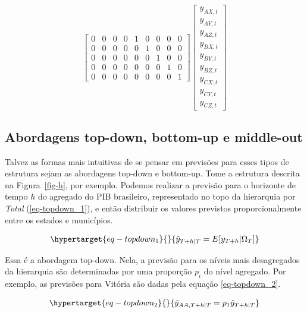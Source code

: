 \documentclass[
  12pt,
  oneside,
  a4paper,
  chapter=TITLE,
  section=TITLE,
  brazil]{abntex2}
\begin{document}
\begin{equation}
{\begin{bmatrix}
    0 & 0 & 0 & 0 & 1 & 0 & 0 & 0 & 0 \\
    0 & 0 & 0 & 0 & 0 & 1 & 0 & 0 & 0 \\
    0 & 0 & 0 & 0 & 0 & 0 & 1 & 0 & 0 \\
    0 & 0 & 0 & 0 & 0 & 0 & 0 & 1 & 0 \\
    0 & 0 & 0 & 0 & 0 & 0 & 0 & 0 & 1
\end{bmatrix}
\begin{bmatrix}
    y_{AX, t} \\
    y_{AY, t} \\
    y_{AZ, t} \\
    y_{BX, t} \\
    y_{BY, t} \\
    y_{BZ, t} \\
    y_{CX, t} \\
    y_{CY, t} \\
    y_{CZ, t}
\end{bmatrix}
}\label{eq-matriz_ha}\end{equation}

\hypertarget{abordagens-top-down-bottom-up-e-middle-out}{%
\subsection{Abordagens top-down, bottom-up e
middle-out}\label{abordagens-top-down-bottom-up-e-middle-out}}

Talvez as formas mais intuitivas de se pensar em previsões para esses
tipos de estrutura sejam as abordagens top-down e bottom-up. Tome a
estrutura descrita na Figura~\ref{fig-h}, por exemplo. Podemos realizar
a previsão para o horizonte de tempo \(h\) do agregado do PIB
brasileiro, representado no topo da hierarquia por \emph{Total}
(\ref{eq-topdown_1}), e então distribuir os valores previstos
proporcionalmente entre os estados e municípios.

\begin{equation}\protect\hypertarget{eq-topdown_1}{}{
\hat{y}_{T+h | T} = E[y_{T+h} | \Omega_T]
}\label{eq-topdown_1}\end{equation}

Essa é a abordagem top-down. Nela, a previsão para os níveis mais
desagregados da hierarquia são determinadas por uma proporção \(p_i\) do
nível agregado. Por exemplo, as previsões para Vitória são dadas pela
equação \ref{eq-topdown_2}.

\begin{equation}\protect\hypertarget{eq-topdown_2}{}{
\tilde{y}_{AA, T+h | T} = p_{1}\hat{y}_{T+h | T}
}\label{eq-topdown_2}\end{equation}
\end{document}
